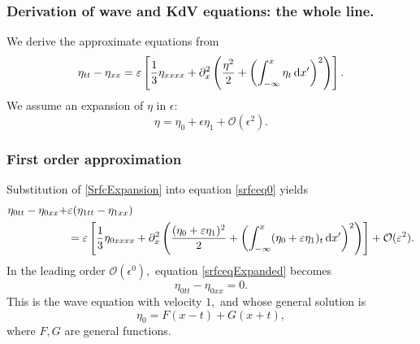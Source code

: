 \documentclass[11pt,reqno,oneside,a4paper]{article}
\begin{document}

\subsubsection{Derivation of wave and KdV equations: the whole line.}
We derive the approximate equations from
\begin{equation}\label{srfceq0}
\eta_{tt} - \eta_{xx} = \varepsilon \left[ \frac{1}{3}\eta_{xxxx} +  \partial_x^2 \left( \frac{\eta^2}{2} + \left( \int^{x}_{-\infty} \eta_t \,\mathrm{d} x' \right)^2\right)\right].
\end{equation}
We assume an expansion of $\eta$ in $\epsilon:$
\begin{equation}\label{SrfcExpansion}
\eta = \eta_0 + \epsilon \eta_1 + \mathcal{O}(\epsilon^2).
\end{equation}
\subsubsection*{First order approximation}
Substitution of \eqref{SrfcExpansion} into equation \eqref{srfceq0} yields
\begin{equation}\label{srfceqExpanded}
\begin{aligned}
\eta_{0tt} - \eta_{0xx} +&\varepsilon(\eta_{1tt} - \eta_{1xx}) \\
&= \varepsilon \left[ \frac{1}{3}\eta_{0xxxx} +  \partial_x^2 \left( \frac{(\eta_0 + \varepsilon \eta_1)^2}{2} + \left( \int^{x}_{-\infty} (\eta_0 + \varepsilon \eta_1)_t \,\mathrm{d} x' \right)^2\right)\right] + \mathcal{O}(\varepsilon^2). 
\end{aligned}
\end{equation}
In the leading order $\mathcal{O}(\epsilon^0),$ equation \eqref{srfceqExpanded} becomes
\begin{equation*}
\eta_{0tt} - \eta_{0xx} = 0.
\end{equation*}
This is the wave equation with velocity $1,$ and whose general solution is 
\[ \eta_0 = F(x-t) + G(x+t), \]
where $F,G$ are general functions. 
\end{document}
